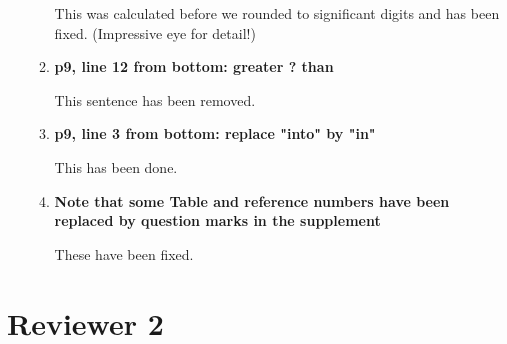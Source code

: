 \documentclass[10pt]{article}
\begin{document}
\begin{enumerate}
\begin{enumerate}
	This was calculated before we rounded to significant digits and has been fixed. (Impressive eye for detail!) \\
	
	\item \textbf{p9, line 12 from bottom: greater ? than}
	
	This sentence has been removed. \\
	
	\item \textbf{p9, line 3 from bottom: replace "into" by "in"}
	
	This has been done. \\
	
	\item \textbf{Note that some Table and reference numbers have been replaced by question marks in the supplement}	
	
	These have been fixed.	
	
\end{enumerate}

\end{enumerate}





\section*{Reviewer 2}
\end{document}

